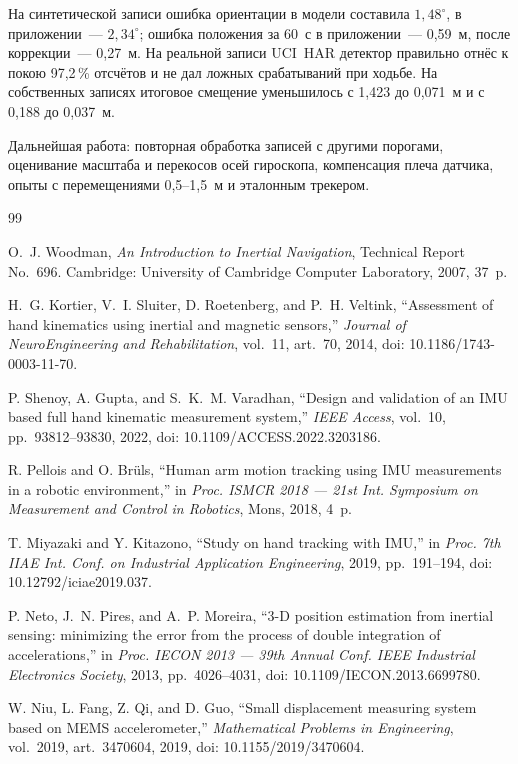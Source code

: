 \documentclass{misisarticle}
\begin{document}
На синтетической записи ошибка ориентации в модели составила $1{,}48^\circ$, в приложении~--- $2{,}34^\circ$; ошибка положения за 60~с в приложении~--- 0,59~м, после коррекции~--- 0,27~м. На реальной записи UCI~HAR детектор правильно отнёс к покою 97,2\,\% отсчётов и не дал ложных срабатываний при ходьбе. На собственных записях итоговое смещение уменьшилось с 1,423 до 0,071~м и с 0,188 до 0,037~м.

Дальнейшая работа: повторная обработка записей с другими порогами, оценивание масштаба и перекосов осей гироскопа, компенсация плеча датчика, опыты с перемещениями 0,5--1,5~м и эталонным трекером.

\begin{thebibliography}{99}

 O.~J. Woodman, \textit{An Introduction to Inertial Navigation}, Technical Report No.~696. Cambridge: University of Cambridge Computer Laboratory, 2007, 37~p.

 H.~G. Kortier, V.~I. Sluiter, D. Roetenberg, and P.~H. Veltink, ``Assessment of hand kinematics using inertial and magnetic sensors,'' \textit{Journal of NeuroEngineering and Rehabilitation}, vol.~11, art.~70, 2014, doi: 10.1186/1743-0003-11-70.

 P. Shenoy, A. Gupta, and S.~K.~M. Varadhan, ``Design and validation of an IMU based full hand kinematic measurement system,'' \textit{IEEE Access}, vol.~10, pp.~93812--93830, 2022, doi: 10.1109/ACCESS.2022.3203186.

 R. Pellois and O. Brüls, ``Human arm motion tracking using IMU measurements in a robotic environment,'' in \textit{Proc. ISMCR 2018 --- 21st Int. Symposium on Measurement and Control in Robotics}, Mons, 2018, 4~p.

 T. Miyazaki and Y. Kitazono, ``Study on hand tracking with IMU,'' in \textit{Proc. 7th IIAE Int. Conf. on Industrial Application Engineering}, 2019, pp.~191--194, doi: 10.12792/iciae2019.037.

 P. Neto, J.~N. Pires, and A.~P. Moreira, ``3-D position estimation from inertial sensing: minimizing the error from the process of double integration of accelerations,'' in \textit{Proc. IECON 2013 --- 39th Annual Conf. IEEE Industrial Electronics Society}, 2013, pp.~4026--4031, doi: 10.1109/IECON.2013.6699780.

 W. Niu, L. Fang, Z. Qi, and D. Guo, ``Small displacement measuring system based on MEMS accelerometer,'' \textit{Mathematical Problems in Engineering}, vol.~2019, art.~3470604, 2019, doi: 10.1155/2019/3470604.


\end{thebibliography}
\end{document}
